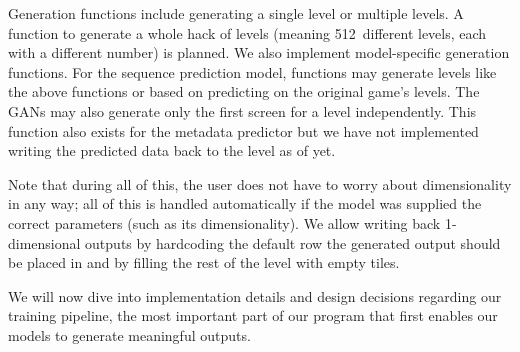 Generation functions include generating a single level or multiple
levels. A function to generate a whole hack of levels (meaning
512~different levels, each with a different number) is planned. We
also implement model-specific generation functions. For the sequence
prediction model, functions may generate levels like the above
functions or based on predicting on the original game's levels. The
GANs may also generate only the first screen for a level
independently. This function also exists for the metadata predictor
but we have not implemented writing the predicted data back to the
level as of yet.

Note that during all of this, the user does not have to worry about
dimensionality in any way; all of this is handled automatically if the
model was supplied the correct parameters (such as its
dimensionality). We allow writing back 1-dimensional outputs by
hardcoding the default row the generated output should be placed in
and by filling the rest of the level with empty tiles.

We will now dive into implementation details and design decisions
regarding our training pipeline, the most important part of our
program that first enables our models to generate meaningful outputs.


